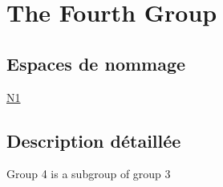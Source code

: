 \hypertarget{group__group4}{}\section{The Fourth Group}
\label{group__group4}
\subsection*{Espaces de nommage}
\begin{DoxyCompactItemize}
\item 
 \hyperlink{namespace_n1}{N1}
\end{DoxyCompactItemize}


\subsection{Description détaillée}
Group 4 is a subgroup of group 3 